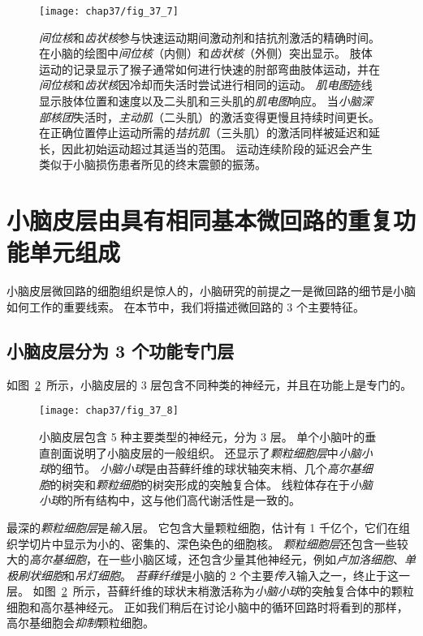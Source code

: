\begin{figure}[htbp]
	\centering
	\texttt{[image: chap37/fig\_37\_7]}
	\caption{\textit{间位核}和\textit{齿状核}参与快速运动期间激动剂和拮抗剂激活的精确时间。
		在小脑的绘图中\textit{间位核}（内侧）和\textit{齿状核}（外侧）突出显示。
		肢体运动的记录显示了猴子通常如何进行快速的肘部弯曲肢体运动，并在\textit{间位核}和\textit{齿状核}因冷却而失活时尝试进行相同的运动。
		\textit{肌电图}迹线显示肢体位置和速度以及二头肌和三头肌的\textit{肌电图}响应。
		当\textit{小脑深部核团}失活时，\textit{主动肌}（二头肌）的激活变得更慢且持续时间更长。
		在正确位置停止运动所需的\textit{拮抗肌}（三头肌）的激活同样被延迟和延长，因此初始运动超过其适当的范围。
		运动连续阶段的延迟会产生类似于小脑损伤患者所见的终末震颤的振荡。}
	\label{fig:37_7}
\end{figure}




\section{小脑皮层由具有相同基本微回路的重复功能单元组成}

小脑皮层微回路的细胞组织是惊人的，小脑研究的前提之一是微回路的细节是小脑如何工作的重要线索。
在本节中，我们将描述微回路的 3 个主要特征。


\subsection{小脑皮层分为 3 个功能专门层}

如图~\ref{fig:37_8}~所示，小脑皮层的 3 层包含不同种类的神经元，并且在功能上是专门的。


\begin{figure}[htbp]
	\centering
	\texttt{[image: chap37/fig\_37\_8]}
	\caption{小脑皮层包含 5 种主要类型的神经元，分为 3 层。
		单个小脑叶的垂直剖面说明了小脑皮层的一般组织。
		还显示了\textit{颗粒细胞层}中\textit{小脑小球}的细节。
		\textit{小脑小球}是由苔藓纤维的球状轴突末梢、几个\textit{高尔基细胞}的树突和\textit{颗粒细胞}的树突形成的突触复合体。
		线粒体存在于\textit{小脑小球}的所有结构中，这与他们高代谢活性是一致的。}
	\label{fig:37_8}
\end{figure}


最深的\textit{颗粒细胞层}是\textit{输入}层。
它包含大量颗粒细胞，估计有 1 千亿个，它们在组织学切片中显示为小的、密集的、深色染色的细胞核。
\textit{颗粒细胞层}还包含一些较大的\textit{高尔基细胞}，在一些小脑区域，还包含少量其他神经元，例如\textit{卢加洛细胞}、\textit{单极刷状细胞}和\textit{吊灯细胞}。
\textit{苔藓纤维}是小脑的 2 个主要\textit{传入}输入之一，终止于这一层。
如图~\ref{fig:37_8}~所示，苔藓纤维的球状末梢激活称为\textit{小脑小球}的突触复合体中的颗粒细胞和高尔基神经元。
正如我们稍后在讨论小脑中的循环回路时将看到的那样，高尔基细胞会\textit{抑制}颗粒细胞。


